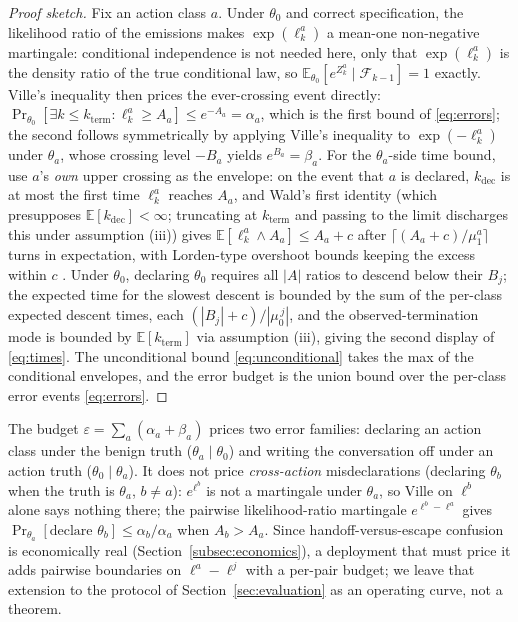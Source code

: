 \begin{proof}[Proof sketch]
Fix an action class $a$.
Under $\theta_0$ and correct specification, the likelihood ratio of the emissions makes
$\exp(\ell_k^{a})$ a mean-one non-negative martingale: conditional independence is not needed
here, only that $\exp(\ell_k^{a})$ is the density ratio of the true conditional law, so
$\mathbb{E}_{\theta_0}[e^{Z_k^{a}} \mid \mathcal{F}_{k-1}] = 1$ exactly.
Ville's inequality then prices the ever-crossing event directly:
$\Pr_{\theta_0}[\exists k \leq k_{\mathrm{term}}: \ell_k^{a} \geq A_a] \leq e^{-A_a} = \alpha_a$,
which is the first bound of \eqref{eq:errors}; the second follows symmetrically by applying
Ville's inequality to $\exp(-\ell_k^{a})$ under $\theta_a$, whose crossing level $-B_a$ yields
$e^{B_a} = \beta_a$.
For the $\theta_a$-side time bound, use $a$'s \emph{own} upper crossing as the envelope: on the
event that $a$ is declared, $k_{\mathrm{dec}}$ is at most the first time $\ell_k^{a}$ reaches
$A_a$, and Wald's first identity (which presupposes $\mathbb{E}[k_{\mathrm{dec}}] < \infty$;
truncating at $k_{\mathrm{term}}$ and passing to the limit discharges this under assumption (iii))
gives $\mathbb{E}[\ell_k^{a} \wedge A_a] \leq A_a + c$ after $\lceil (A_a+c)/\mu_1^{a} \rceil$
turns in expectation, with Lorden-type overshoot bounds keeping the excess within $c$
\citep{lorden1970excess}.
Under $\theta_0$, declaring $\theta_0$ requires all $|A|$ ratios to descend below their $B_j$;
the expected time for the slowest descent is bounded by the sum of the per-class expected
descent times, each $(|B_j| + c)/|\mu_0^{\,j}|$, and the observed-termination mode is bounded
by $\mathbb{E}[k_{\mathrm{term}}]$ via assumption (iii), giving the second display of
\eqref{eq:times}.
The unconditional bound \eqref{eq:unconditional} takes the max of the conditional envelopes,
and the error budget is the union bound over the per-class error events
\eqref{eq:errors}.
\end{proof}

\begin{remark}
\label{rem:budget_scope}
The budget $\varepsilon = \sum_a (\alpha_a + \beta_a)$ prices two error families: declaring an
action class under the benign truth ($\theta_a \mid \theta_0$) and writing the conversation off
under an action truth ($\theta_0 \mid \theta_a$).
It does not price \emph{cross-action} misdeclarations (declaring $\theta_b$ when the truth is
$\theta_a$, $b \neq a$): $e^{\ell^b}$ is not a martingale under $\theta_a$, so Ville on
$\ell^b$ alone says nothing there; the pairwise likelihood-ratio martingale $e^{\ell^b - \ell^a}$
gives $\Pr_{\theta_a}[\text{declare } \theta_b] \leq \alpha_b / \alpha_a$ when $A_b > A_a$.
Since handoff-versus-escape confusion is economically real (Section~\ref{subsec:economics}), a
deployment that must price it adds pairwise boundaries on $\ell^a - \ell^j$ with a per-pair
budget; we leave that extension to the protocol of Section~\ref{sec:evaluation} as an operating
curve, not a theorem.
\end{remark}

